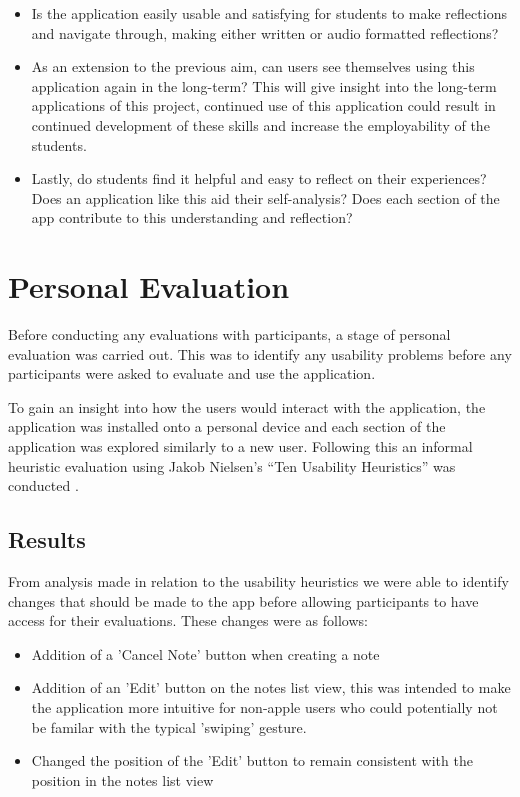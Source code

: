 \documentclass{l4proj}
\begin{document}
\begin{itemize}
    \item Is the application easily usable and satisfying for students to make reflections and navigate through, making either written or audio formatted reflections?
    \item As an extension to the previous aim, can users see themselves using this application again in the long-term? This will give insight into the long-term applications of this project, continued use of this application could result in continued development of these skills and increase the employability of the students.
    \item Lastly, do students find it helpful and easy to reflect on their experiences? Does an application like this aid their self-analysis? Does each section of the app contribute to this understanding and reflection?
\end{itemize}

\section{Personal Evaluation}
Before conducting any evaluations with participants, a stage of personal evaluation was carried out. This was to identify any usability problems before any participants were asked to evaluate and use the application. 
 
To gain an insight into how the users would interact with the application, the application was installed onto a personal device and each section of the application was explored similarly to a new user. Following this an informal heuristic evaluation using Jakob Nielsen’s “Ten Usability Heuristics” was conducted \citep{Nielsen10}. 

\subsection{Results}
From analysis made in relation to the usability heuristics we were able to identify changes that should be made to the app before allowing participants to have access for their evaluations. These changes were as follows:
\begin{itemize}
    \item Addition of a 'Cancel Note' button when creating a note
    \item Addition of an 'Edit' button on the notes list view, this was intended to make the application more intuitive for non-apple users who could potentially not be familar with the typical 'swiping' gesture.
    \item Changed the position of the 'Edit' button to remain consistent with the position in the notes list view
\end{itemize}
\end{document}

